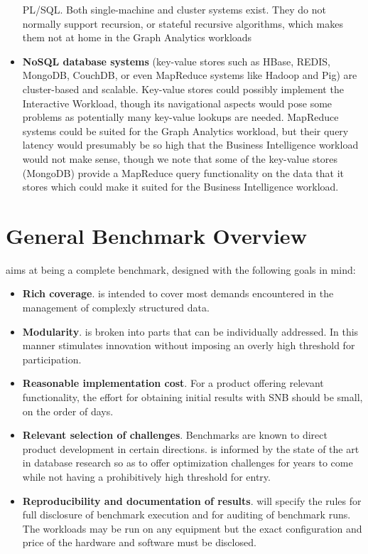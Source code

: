 \begin{itemize}
     PL/SQL. Both single-machine and cluster systems exist.  They  do not
     normally support recursion, or stateful recursive algorithms, which makes
     them not at home in the Graph Analytics workloads
 \item \textbf{NoSQL database systems} (\eg key-value stores such as HBase,
     REDIS, MongoDB, CouchDB, or even MapReduce systems like Hadoop and Pig)
     are cluster-based and scalable. Key-value stores could possibly implement
     the Interactive Workload, though its navigational aspects would pose some
     problems as potentially many key-value lookups are needed. MapReduce
     systems could be suited for the Graph Analytics workload, but their query
     latency would presumably be so high that the Business Intelligence
     workload would not make sense, though we note that some of the key-value
     stores (\eg MongoDB) provide a MapReduce query functionality on the data
     that it stores which could make it suited for the Business Intelligence workload.
\end{itemize}


\section{General Benchmark Overview}

\ldbcsnb aims at being a complete benchmark, designed with the following goals in mind:

\begin{itemize}
 \item \textbf{Rich coverage}. \ldbcsnb is intended to cover most demands
     encountered in the management of complexly structured data.
 \item \textbf{Modularity}. \ldbcsnb is broken into parts that can be
     individually addressed. In this manner \ldbcsnb
     stimulates innovation without imposing an overly high threshold for
     participation.
 \item \textbf{Reasonable implementation cost}. For a product offering relevant
     functionality, the effort for obtaining initial results with SNB should be
     small, on the order of days.
 \item \textbf{Relevant selection of challenges}. Benchmarks are known to
     direct product development in certain directions. \ldbcsnb is informed by
     the state of the art in database research so as to offer optimization
     challenges for years to come while not having a prohibitively high
     threshold for entry.
 \item \textbf{Reproducibility and documentation of results}. \ldbcsnb
     will specify the rules for full disclosure of benchmark execution and for
     auditing of benchmark runs. The workloads may be run on any equipment
     but the exact configuration and price of the hardware and software must be
     disclosed.
\end{itemize}

